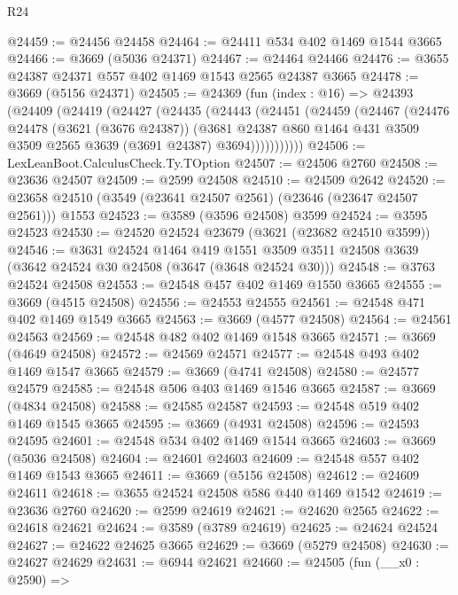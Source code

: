 \begin{lexlean}{R24}
\begin{coremodule}
@24459 := @24456 @24458
@24464 := @24411 @534 @402 @1469 @1544 @3665
@24466 := @3669 (@5036 @24371)
@24467 := @24464 @24466
@24476 := @3655 @24387 @24371 @557 @402 @1469 @1543 @2565 @24387 @3665
@24478 := @3669 (@5156 @24371)
@24505 := @24369
    (fun (index : @16) =>
    @24393
      (@24409
        (@24419
          (@24427
            (@24435
              (@24443
                (@24451
                  (@24459
                    (@24467
                      (@24476
                        @24478
                        (@3621 (@3676 @24387))
                        (@3681
                          @24387
                          @860
                          @1464
                          @431
                          @3509
                          @3509
                          @2565
                          @3639
                          (@3691 @24387)
                          @3694)))))))))))
@24506 := LexLeanBoot.CalculusCheck.Ty.TOption
@24507 := @24506 @2760
@24508 := @23636 @24507
@24509 := @2599 @24508
@24510 := @24509 @2642
@24520 := @23658 @24510 (@3549 (@23641 @24507 @2561) (@23646 (@23647 @24507 @2561))) @1553
@24523 := @3589 (@3596 @24508) @3599
@24524 := @3595 @24523
@24530 := @24520 @24524 @23679 (@3621 (@23682 @24510 @3599))
@24546 := @3631
    @24524
    @1464
    @419
    @1551
    @3509
    @3511
    @24508
    @3639
    (@3642 @24524 @30 @24508 (@3647 (@3648 @24524 @30)))
@24548 := @3763 @24524 @24508
@24553 := @24548 @457 @402 @1469 @1550 @3665
@24555 := @3669 (@4515 @24508)
@24556 := @24553 @24555
@24561 := @24548 @471 @402 @1469 @1549 @3665
@24563 := @3669 (@4577 @24508)
@24564 := @24561 @24563
@24569 := @24548 @482 @402 @1469 @1548 @3665
@24571 := @3669 (@4649 @24508)
@24572 := @24569 @24571
@24577 := @24548 @493 @402 @1469 @1547 @3665
@24579 := @3669 (@4741 @24508)
@24580 := @24577 @24579
@24585 := @24548 @506 @403 @1469 @1546 @3665
@24587 := @3669 (@4834 @24508)
@24588 := @24585 @24587
@24593 := @24548 @519 @402 @1469 @1545 @3665
@24595 := @3669 (@4931 @24508)
@24596 := @24593 @24595
@24601 := @24548 @534 @402 @1469 @1544 @3665
@24603 := @3669 (@5036 @24508)
@24604 := @24601 @24603
@24609 := @24548 @557 @402 @1469 @1543 @3665
@24611 := @3669 (@5156 @24508)
@24612 := @24609 @24611
@24618 := @3655 @24524 @24508 @586 @440 @1469 @1542
@24619 := @23636 @2760
@24620 := @2599 @24619
@24621 := @24620 @2565
@24622 := @24618 @24621
@24624 := @3589 (@3789 @24619)
@24625 := @24624 @24524
@24627 := @24622 @24625 @3665
@24629 := @3669 (@5279 @24508)
@24630 := @24627 @24629
@24631 := @6944 @24621
@24660 := @24505
    (fun (__x0 : @2590) =>

\end{coremodule}
\end{lexlean}
